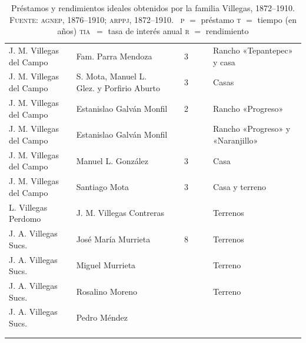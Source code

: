 \documentclass[14pt,twoside,final]{extbook} %
\begin{document}
{\begin{longtable}[c]{@{}p{2.5cm}lrSrrl@{}}
J. M. Villegas del Campo & Fam. Parra Mendoza &  & 3 &  &  & Rancho «Tepantepec» y casa \\
J. M. Villegas del Campo & S. Mota, Manuel L. Glez. y Porfirio Aburto &  & 3 &  &  & Casas \\
J. M. Villegas del Campo & Estanislao Galván Monfil &  & 2 & {} & {} & Rancho «Progreso» \\
J. M. Villegas del Campo & Estanislao Galván Monfil &  & {} & {} & {} & Rancho «Progreso» y «Naranjillo» \\
J. M. Villegas del Campo & Manuel L. González &  & 3 &  &  & Casa \\
J. M. Villegas del Campo & Santiago Mota &  & 3 &  &  & Casa y terreno \\
L. Villegas Perdomo & J. M. Villegas Contreras &  & {} & {} & {} & Terrenos \\
J. A. Villegas Sucs. & José María Murrieta &  & 8 &  &  & Terrenos \\
J. A. Villegas Sucs. & Miguel Murrieta &  & {} & {} & {} & Terreno \\
J. A. Villegas Sucs. & Rosalino Moreno &  & {} & {} & {} & Terreno \\
J. A. Villegas Sucs. & Pedro Méndez &  & {} & {} & {} & {} \\
\midrule
{} & {} &  & {} & {} &  & {} \\
\bottomrule
\caption[Préstamos y rendimientos ideales obtenidos por la familia Villegas, 1872--1910]{Préstamos y rendimientos ideales obtenidos por la familia Villegas, 1872--1910. \textsc{Fuente:} \textsc{agnep}, 1876--1910; \textsc{arppj}, 1872--1910. \hspace{0.5em}~\textsc{p} $=$ préstamo \hspace{0.5em} \textsc{t} $=$ tiempo (en años) \hspace{0.5em}\textsc{tia}~$=$ tasa de interés anual \hspace{0.5em} \textsc{r} $=$ rendimiento}
\label{tab:prestamos-y-rendimientos}
\end{longtable}
}%
\end{document}
